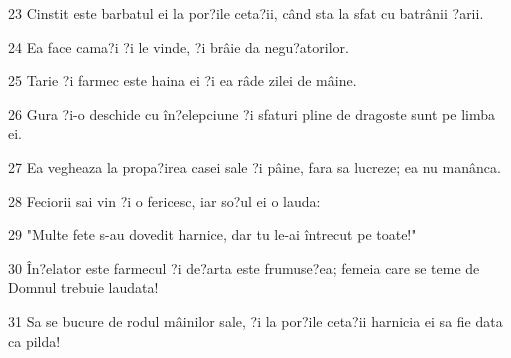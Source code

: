 \par 23 Cinstit este barbatul ei la por?ile ceta?ii, când sta la sfat cu batrânii ?arii.
\par 24 Ea face cama?i ?i le vinde, ?i brâie da negu?atorilor.
\par 25 Tarie ?i farmec este haina ei ?i ea râde zilei de mâine.
\par 26 Gura ?i-o deschide cu în?elepciune ?i sfaturi pline de dragoste sunt pe limba ei.
\par 27 Ea vegheaza la propa?irea casei sale ?i pâine, fara sa lucreze; ea nu manânca.
\par 28 Feciorii sai vin ?i o fericesc, iar so?ul ei o lauda:
\par 29 "Multe fete s-au dovedit harnice, dar tu le-ai întrecut pe toate!"
\par 30 În?elator este farmecul ?i de?arta este frumuse?ea; femeia care se teme de Domnul trebuie laudata!
\par 31 Sa se bucure de rodul mâinilor sale, ?i la por?ile ceta?ii harnicia ei sa fie data ca pilda!



